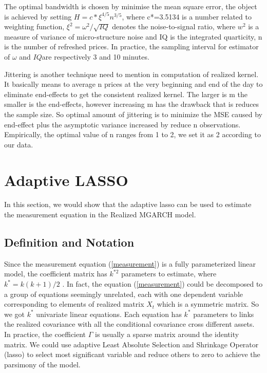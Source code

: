 \documentclass[titlepage,11pt]{article}
\begin{document}
The optimal bandwidth is chosen by  minimise the mean square error,  the object is achieved by setting $H = c*\xi^{4/5}n^{3/5}$, where  c*=3.5134 is a number related to weighting function, $\xi^2 =\omega^2/{\sqrt{IQ}}$ denotes the noise-to-signal ratio, where $w^2$ is a measure of variance of micro-structure noise and IQ is the integrated quarticity, n is the number of refreshed prices. In practice, the sampling interval for estimator of $\omega$ and $IQ$are respectively 3 and 10 minutes. 

Jittering is another technique need to mention in computation of realized kernel. It basically means to average n prices at the very beginning and end of the day to eliminate end-effects to get the consistent realized kernel. The
larger is m the smaller is the end-effects, however increasing m has
the drawback that is reduces the sample size. So optimal amount of jittering is to minimize the MSE caused by end-effect plus the asymptotic variance increased by reduce n observations. Empirically, the optimal value of n ranges from 1 to 2, we set it as 2 according to our data. 





\section{Adaptive LASSO}

In this section, we would show that the adaptive lasso can be used to estimate the measurement equation in the Realized MGARCH model.
\subsection{Definition and Notation}

Since the measurement equation (\ref{measurement})    is a fully parameterized linear model, the coefficient matrix  has $k^{*2}$ parameters to estimate, where $k^*=k(k+1)/2$ . In fact, the equation (\ref{measurement}) could be decomposed to a group of equations seemingly unrelated, each with one dependent variable corresponding to elements of realized matrix $X_t$ which is a symmetric matrix. So we got $k^*$ univariate linear equations. Each equation has $k^*$ parameters to links the realized covariance with all the conditional covariance cross different assets.
In practice, the coefficient $\Gamma$ is usually a sparse matrix around the identity matrix. We could use adaptive Least Absolute Selection and Shrinkage Operator (lasso) to select most significant variable and reduce others to zero to achieve the parsimony of the model.
\end{document}

